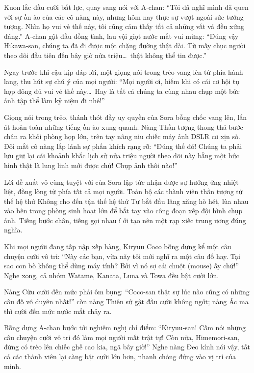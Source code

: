 \documentclass[../main.tex]{subfiles}
\begin{document}
Kuon lắc đầu cười bất lực, quay sang nói với A-chan: ``Tôi đã nghĩ mình đã quen với sự ồn ào của các cô nàng này, nhưng hôm nay thực sự vượt ngoài sức tưởng tượng. Nhìn họ vui vẻ thế này, tôi cũng cảm thấy tất cả những vất vả đều xứng đáng.'' A-chan gật đầu đồng tình, lau vội giọt nước mắt vui mừng: ``Đúng vậy Hikawa-san, chúng ta đã đi được một chặng đường thật dài. Từ mấy chục người theo dõi đầu tiên đến bây giờ nửa triệu\dots\ thật không thể tin được.''

Ngay trước khi cậu kịp đáp lời, một giọng nói trong trẻo vang lên từ phía hành lang, thu hút sự chú ý của mọi người: ``Mọi người ơi, hiếm khi có cái cơ hội tụ họp đông đủ vui vẻ thế này\dots\ Hay là tất cả chúng ta cùng nhau chụp một bức ảnh tập thể làm kỷ niệm đi nhé!''


Giọng nói trong trẻo, thánh thót đầy uy quyền của Sora bỗng chốc vang lên, lấn át hoàn toàn những tiếng ồn ào xung quanh. Nàng Thần tượng thong thả bước chân ra khỏi phòng họp lớn, trên tay nâng niu chiếc máy ảnh DSLR cơ xịn sò. Đôi mắt cô nàng lấp lánh sự phấn khích rạng rỡ: ``Đúng thế đó! Chúng ta phải lưu giữ lại cái khoảnh khắc lịch sử nửa triệu người theo dõi này bằng một bức hình thật là lung linh mới được chứ! Chụp ảnh thôi nào!''

Lời đề xuất vô cùng tuyệt vời của Sora lập tức nhận được sự hưởng ứng nhiệt liệt, đồng lòng từ phía tất cả mọi người. Toàn bộ các thành viên thần tượng từ thế hệ thứ Không cho đến tận thế hệ thứ Tư bắt đầu lăng xăng hò hét, lùa nhau vào bên trong phòng sinh hoạt lớn để bắt tay vào công đoạn xếp đội hình chụp ảnh. Tiếng bước chân, tiếng gọi nhau í ới tạo nên một rạp xiếc trung ương đúng nghĩa.

Khi mọi người đang tấp nập xếp hàng, Kiryuu Coco bỗng dưng kể một câu chuyện cười vô tri: ``Này các bạn, vừa nãy tôi mới nghĩ ra một câu đố hay. Tại sao con bò không thể dùng máy tính? Bởi vì nó sợ cái chuột (mouse) ấy chứ!'' Nghe xong, cả nhóm Watame, Kanata, Luna và Towa đều bật cười lớn.


Nàng Cừu cười đến mức phải ôm bụng: ``Coco-san thật sự lúc nào cũng có những câu đố vô duyên nhất!'' còn nàng Thiên sứ gật đầu cười không ngớt; nàng Ác ma thì cười đến mức nước mắt chảy ra.

Bỗng dưng A-chan bước tới nghiêm nghị chỉ điểm: ``Kiryuu-san! Cấm nói những câu chuyện cười vô tri đó làm mọi người mất trật tự! Còn nữa, Himemori-san, đừng có trèo lên chiếc ghế cao kia, ngã bây giờ!'' Nghe nàng Đeo kính nói vậy, tất cả các thành viên lại càng bật cười lớn hơn, nhanh chóng đứng vào vị trí của mình.
\end{document}
